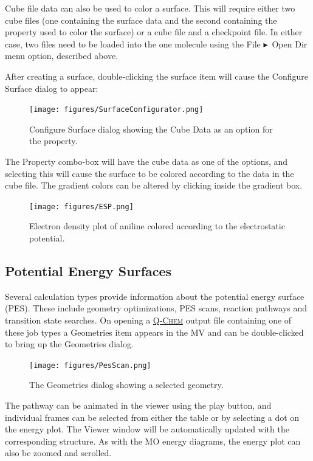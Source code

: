 \documentclass[a4paper,12pt]{article}
\newcommand{\qchem}{\href{http://q-chem.com}{{\scshape Q-Chem}}}
\newcommand{\bt}{\ensuremath{\blacktriangleright}}
\begin{document}
Cube file data can also be used to color a surface.  This will require either
two cube files (one containing the surface data and the second containing the
property used to color the surface) or a cube file and a checkpoint file.  In
either case, two files need to be loaded into the one molecule using the File
\bt\ Open Dir menu option, described above.

After creating a surface, double-clicking the surface item will
cause the Configure Surface dialog to appear:
\begin{figure}[h]
\begin{center}
\texttt{[image: figures/SurfaceConfigurator.png]}
\caption{Configure Surface dialog showing the Cube Data as an option for the property.}
\label{fig:surfaceconfig}
\end{center}
\end{figure}

The Property combo-box will have the cube data as one of the options, and selecting
this will cause the surface to be colored according to the data in the cube file.
The gradient colors can be altered by clicking inside the gradient box.
\begin{figure}[h]
\begin{center}
\texttt{[image: figures/ESP.png]}
\end{center}
\caption{Electron density plot of aniline colored according to the electrostatic potential.}
\end{figure}


\subsection{Potential Energy Surfaces}

Several calculation types provide information about the potential energy
surface (PES).  These include geometry optimizations, PES scans, reaction
pathways and transition state searches.  On opening a \qchem{} output file
containing one of these job types a Geometries item appears in the MV and can
be double-clicked to bring up the Geometries dialog.
\begin{figure}[h]
\begin{center}
\texttt{[image: figures/PesScan.png]}
\caption{The Geometries dialog showing a selected geometry. }
\end{center}
\end{figure}

The pathway can be animated in the viewer using the play button, and individual
frames can be selected from either the table or by selecting a dot on the
energy plot.  The Viewer window will be automatically updated with the
corresponding structure.  As with the MO energy diagrams, the energy plot can
also be zoomed and scrolled.
\end{document}
